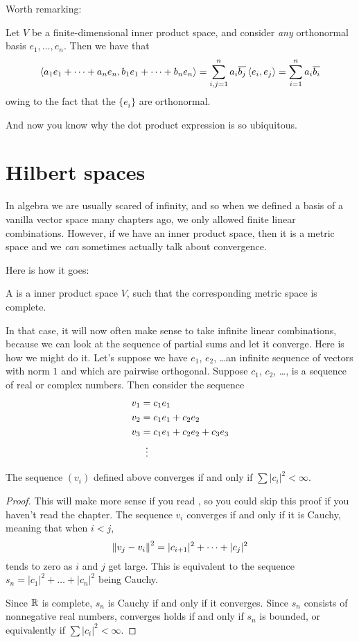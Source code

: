 Worth remarking:
\begin{example}
	Let $V$ be a finite-dimensional inner product space,
	and consider \emph{any} orthonormal basis $e_1, \dots, e_n$.
	Then we have that
	\[ \left< a_1 e_1 + \dots + a_n e_n,
		b_1 e_1 + \dots + b_n e_n \right>
		= \sum_{i,j=1}^n a_i\overline{b_j} \left< e_i, e_j \right>
		= \sum_{i=1}^n a_i \overline{b_i} \]
	owing to the fact that the $\{e_i\}$ are orthonormal.
\end{example}
And now you know why the dot product expression is so ubiquitous.

\section{Hilbert spaces}
In algebra we are usually scared of infinity,
and so when we defined a basis of a vanilla vector space many chapters ago,
we only allowed finite linear combinations.
However, if we have an inner product space,
then it is a metric space and we \emph{can}
sometimes actually talk about convergence.

Here is how it goes:
\begin{definition}
	A  is a inner product space $V$,
	such that the corresponding metric space is complete.
\end{definition}

In that case, it will now often make sense to take infinite linear combinations,
because we can look at the sequence of partial sums and let it converge.
Here is how we might do it.
Let's suppose we have $e_1$, $e_2$, \dots an infinite sequence
of vectors with norm $1$ and which are pairwise orthogonal.
Suppose $c_1$, $c_2$, \dots, is a sequence of real or complex numbers.
Then consider the sequence
\begin{align*}
	v_1 &= c_1 e_1 \\
	v_2 &= c_1 e_1 + c_2 e_2 \\
	v_3 &= c_1 e_1 + c_2 e_2 + c_3 e_3 \\
	&\vdotswithin=
\end{align*}

\begin{proposition}
	The sequence $(v_i)$ defined above
	converges if and only if $\sum \left\lvert c_i \right\rvert^2 < \infty$.
\end{proposition}
\begin{proof}
	This will make more sense if you read ,
	so you could skip this proof if you haven't read the chapter.
	The sequence $v_i$ converges if and only if it is Cauchy,
	meaning that when $i < j$,
	\[ \left\lVert v_j - v_i \right\rVert^2 = |c_{i+1}|^2 + \dots + |c_j|^2 \]
	tends to zero as $i$ and $j$ get large.
	This is equivalent to the sequence
	$s_n = |c_1|^2 + \dots + |c_n|^2$ being Cauchy.

	Since $\mathbb R$ is complete, $s_n$ is Cauchy
	if and only if it converges.
	Since $s_n$ consists of nonnegative real numbers,
	converges holds if and only if $s_n$ is bounded,
	or equivalently if $\sum \left\lvert c_i \right\rvert^2 < \infty$.
\end{proof}

